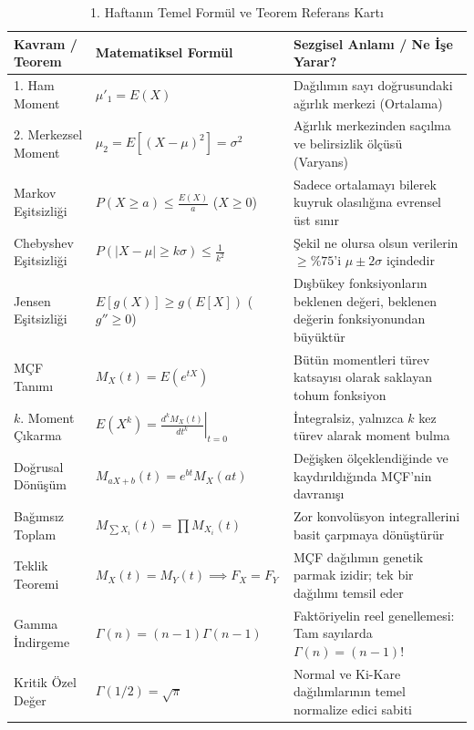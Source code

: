 \documentclass[12pt,a4paper]{article}
\begin{document}
\begin{table}[ht]
\centering
\small
\renewcommand{\arraystretch}{1.4}
\begin{tabularx}{\textwidth}{@{}l l X@{}}
\toprule
\textbf{Kavram / Teorem} & \textbf{Matematiksel Formül} & \textbf{Sezgisel Anlamı / Ne İşe Yarar?} \\ \midrule
1. Ham Moment & $\mu'_1 = E(X)$ & Dağılımın sayı doğrusundaki ağırlık merkezi (Ortalama) \\
2. Merkezsel Moment & $\mu_2 = E[(X-\mu)^2] = \sigma^2$ & Ağırlık merkezinden saçılma ve belirsizlik ölçüsü (Varyans) \\
Markov Eşitsizliği & $P(X \ge a) \le \frac{E(X)}{a}$ ($X \ge 0$) & Sadece ortalamayı bilerek kuyruk olasılığına evrensel üst sınır \\
Chebyshev Eşitsizliği & $P(|X - \mu| \ge k\sigma) \le \frac{1}{k^2}$ & Şekil ne olursa olsun verilerin $\ge \%75$'i $\mu \pm 2\sigma$ içindedir \\
Jensen Eşitsizliği & $E[g(X)] \ge g(E[X])$ ($g'' \ge 0$) & Dışbükey fonksiyonların beklenen değeri, beklenen değerin fonksiyonundan büyüktür \\
MÇF Tanımı & $M_X(t) = E(e^{tX})$ & Bütün momentleri türev katsayısı olarak saklayan tohum fonksiyon \\
$k$. Moment Çıkarma & $E(X^k) = \left. \frac{d^k M_X(t)}{dt^k} \right|_{t=0}$ & İntegralsiz, yalnızca $k$ kez türev alarak moment bulma \\
Doğrusal Dönüşüm & $M_{aX+b}(t) = e^{bt} M_X(at)$ & Değişken ölçeklendiğinde ve kaydırıldığında MÇF'nin davranışı \\
Bağımsız Toplam & $M_{\sum X_i}(t) = \prod M_{X_i}(t)$ & Zor konvolüsyon integrallerini basit çarpmaya dönüştürür \\
Teklik Teoremi & $M_X(t) = M_Y(t) \implies F_X = F_Y$ & MÇF dağılımın genetik parmak izidir; tek bir dağılımı temsil eder \\
Gamma İndirgeme & $\Gamma(n) = (n-1)\Gamma(n-1)$ & Faktöriyelin reel genellemesi: Tam sayılarda $\Gamma(n) = (n-1)!$ \\
Kritik Özel Değer & $\Gamma(1/2) = \sqrt{\pi}$ & Normal ve Ki-Kare dağılımlarının temel normalize edici sabiti \\ \bottomrule
\end{tabularx}
\caption{1. Haftanın Temel Formül ve Teorem Referans Kartı}
\end{table}
\end{document}
